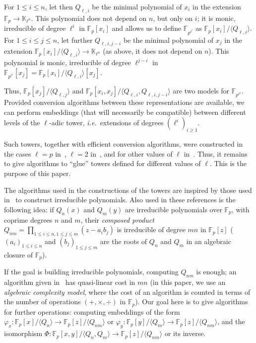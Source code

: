 \documentclass{sig-alternate}
\def\F {\ensuremath{\mathbb{F}}}
\def\K {\ensuremath{\mathbb{K}}}
\newcounter{algo}
\newcommand{\ang}[1]{\langle#1\rangle}
\begin{document}
For $1 \le i \le n$, let then $Q_{\ell,i}$ be the minimal polynomial
of $x_i$ in the extension $\F_p \to \K_{\ell^n}$. This polynomial does
not depend on $n$, but only on $i$; it is monic, irreducible of degree
$\ell^i$ in $\F_p[x_i]$ and allows us to define $\F_{p^{\ell^i}}$ as
$\F_p[x_i]/\ang{Q_{\ell,i}}$.
For $1 \le i \le j \le n$, let further $Q_{\ell,i,j-i}$ be the minimal
polynomial of $x_j$ in the extension $\F_p[x_i]/\ang{Q_{\ell,i}} \to
\K_{\ell^n}$ (as above, it does not depend on $n$). This polynomial is
monic, irreducible of degree $\ell^{j-i}$ in
$\F_{p^{\ell^i}}[x_j]=\F_p[x_i]/\ang{Q_{\ell,i}}[x_j]$.

Thus, $\F_p[x_j]/\ang{Q_{\ell,j}}$ and
$\F_p[x_i,x_j]/\ang{Q_{\ell,i},Q_{\ell,i,j-i}}$ are two models for
$\F_{p^{\ell^j}}$. Provided conversion algorithms between these
representations are available, we can perform embeddings (that will
necessarily be compatible) between different levels of the $\ell$-adic
tower, \emph{i.e.}\ extensions of degrees $(\ell^i)_{i \ge 1}$.

Such towers, together with efficient conversion algorithms, were
constructed in the cases $\ell = p$
in~\cite{cantor89,couveignes00,df+schost12}, $\ell=2$
in~\cite{DoSc12}, and for other values of $\ell$ in~\cite{DeDoSc13}.
Thus, it remains to give algorithms to ``glue'' towers defined for
different values of $\ell$. This is the purpose of this paper.

\smallskip{} The algorithms used
in the constructions of the towers are inspired by those used
in~\cite{Shoup90,shoup94,couveignes+lercier11} to construct
irreducible polynomials. Also used in these references is the
following idea: if $Q_n(x)$ and $Q_m(y)$ are irreducible polynomials
over $\F_p$, with coprime degrees $n$ and $m$, their {\em composed
  product} $Q_{nm} = \prod_{1 \le i \le n, 1 \le j \le m} (z- a_i
b_j)$ is irreducible of degree $mn$ in $\F_p[z]$ ($(a_i)_{1 \le
  i \le n}$ and $(b_j)_{1 \le j \le m}$ are the roots of $Q_n$ and
$Q_m$ in an algebraic closure of $\F_p$).

If the goal is building irreducible polynomials, computing $Q_{nm}$ is
enough; an algorithm given in~\cite{BoFlSaSc06} has quasi-linear cost
in $mn$ (in this paper, we use an {\em algebraic complexity model},
where the cost of an algorithm is counted in terms of the number of
operations $(+,\times,\div)$ in $\F_p$). Our goal here is to give
algorithms for further operations: computing embeddings of the form
$\varphi_x: \F_p[x]/\ang{Q_n}\to \F_p[z]/\ang{Q_{nm}}$ or $\varphi_y:
\F_p[y]/\ang{Q_m}\to \F_p[z]/\ang{Q_{nm}}$, and the isomorphism $\Phi:
\F_p[x,y]/\ang{Q_n,Q_m}\to \F_p[z]/\ang{Q_{nm}}$ or its inverse.
\end{document}
